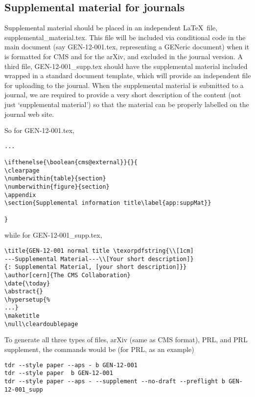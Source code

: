 \subsection{Supplemental material for journals\label{sec:journal-supplements}}
Supplemental material should be placed in an independent \LaTeX\ file, supplemental\_material.tex. This file will be included via conditional code in the main document (say GEN-12-001.tex, representing a GENeric document) when it is formatted for CMS and for the arXiv, and excluded in the journal version. A third file, GEN-12-001\_supp.tex should have the supplemental material included wrapped in a standard document template, which will provide an independent file for uploading to the journal.
When the supplemental material is submitted to a journal, we are required to provide a very short description  of the content (not just `supplemental material') so that the material can be properly labelled on the journal web site.

So for GEN-12-001.tex,
\begin{verbatim}
...

\ifthenelse{\boolean{cms@external}}{}{
\clearpage
\numberwithin{table}{section} 
\numberwithin{figure}{section}
\appendix
\section{Supplemental information title\label{app:suppMat}}

}
\end{verbatim}
while for GEN-12-001\_supp.tex,
\begin{verbatim}
\title{GEN-12-001 normal title \texorpdfstring{\\[1cm]
---Supplemental Material---\\[Your short description]}
{: Supplemental Material, [your short description]}}
\author[cern]{The CMS Collaboration}
\date{\today}
\abstract{}
\hypersetup{%
...}
\maketitle
\null\cleardoublepage

\end{verbatim}

To generate all three types of files, arXiv (same as CMS format), PRL, and PRL supplement, the commands would be (for PRL, as an example)
\begin{verbatim}
tdr --style paper --aps - b GEN-12-001
tdr --style paper  b GEN-12-001
tdr --style paper --aps - --supplement --no-draft --preflight b GEN-12-001_supp
\end{verbatim}

